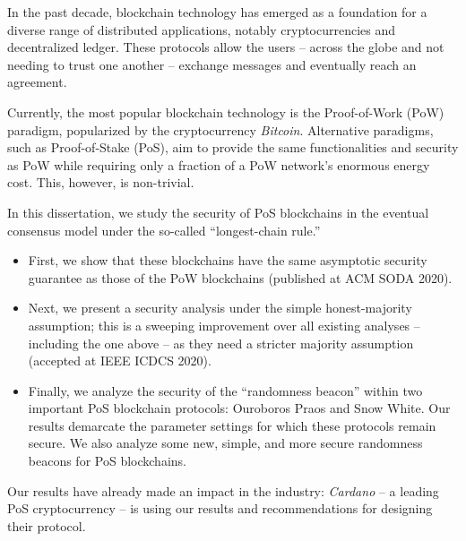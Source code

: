 
In the past decade, blockchain technology has emerged as a foundation for a diverse range of distributed applications, notably cryptocurrencies and decentralized ledger. These protocols allow the users -- across the globe and not needing to trust one another -- exchange messages and eventually reach an agreement. 

 

Currently, the most popular blockchain technology is the Proof-of-Work (PoW) paradigm, popularized by the cryptocurrency \emph{Bitcoin}. Alternative paradigms, such as Proof-of-Stake (PoS), aim to provide the same functionalities and security as PoW while requiring only a fraction of a PoW network's enormous energy cost. This, however, is non-trivial.

 

In this dissertation, we study the security of PoS blockchains in the eventual consensus model under the so-called ``longest-chain rule.'' 
\begin{itemize}
  \item First, we show that these blockchains have the same asymptotic security guarantee as those of the PoW blockchains (published at ACM SODA 2020). 

  \item Next, we present a security analysis under the simple honest-majority assumption; this is a sweeping improvement over all existing analyses -- including the one above -- as they need a stricter majority assumption (accepted at IEEE ICDCS 2020).

  \item Finally, we analyze the security of the ``randomness beacon'' within two important PoS blockchain protocols: Ouroboros Praos and Snow White. Our results demarcate the parameter settings for which these protocols remain secure. We also analyze some new, simple, and more secure randomness beacons for PoS blockchains.


\end{itemize}

Our results have already made an impact in the industry: \emph{Cardano} -- a leading PoS cryptocurrency -- is using our results and recommendations for designing their protocol.

